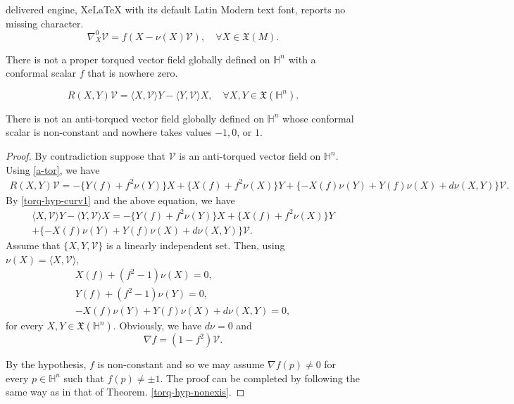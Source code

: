 \documentclass[10pt,a4paper]{amsart}
\def\h{\mathbb H}
\begin{document}
delivered engine, XeLaTeX with its default Latin Modern text font, reports no missing character.
\begin{equation}\label{a-tor}
\nabla^0_X \mathcal{V}=f (X - \nu (X)\mathcal{V}), \quad \forall X\in \mathfrak{X}(M).
\end{equation}

\begin{theorem} \label{torq-hyp-nonexis}
There is not a proper torqued vector field globally defined on $\h^n$ with a conformal scalar $f$ that is nowhere zero.
\end{theorem}

\begin{equation} \label{torq-hyp-curv1}
R(X,Y)\mathcal{V}=\langle X,\mathcal{V}\rangle Y-\langle Y,%
\mathcal{V}\rangle X, \quad \forall X,Y\in \mathfrak{X}(\h^n)  .
\end{equation}%

\begin{theorem}  \label{anti-hyp-nonexis}
There is not an anti-torqued vector field globally defined on $\h^n$ whose conformal scalar is non-constant and nowhere takes values $-1,0$, or $1$.
\end{theorem}

\begin{proof}
By contradiction suppose that $\mathcal{V}$ is an anti-torqued vector field on $\h^n$. Using \eqref{a-tor}, we have
\begin{eqnarray*} \label{anti-hyp}
R(X,Y)\mathcal{V}=-\{ Y(f)+f^{2}\nu (Y)\} X+\{ X(f)+f^{2}\nu(X)\} Y  +\{ -X(f)\nu (Y)+Y(f)\nu (X)+d\nu (X,Y)\} \mathcal{V}. 
\end{eqnarray*}%
By \eqref{torq-hyp-curv1} and the above equation, we have%
\begin{eqnarray*}  \label{anti-hyp2}
\langle X,\mathcal{V}\rangle Y-\langle Y,\mathcal{V}\rangle X =-\{ Y(f)+f^2\nu (Y)\} X+\{
X(f)+f^2\nu (X)\} Y   \\
+\{ -X(f)\nu (Y)+Y(f)\nu (X)+d\nu (X,Y)\} \mathcal{V}. 
\nonumber
\end{eqnarray*}%
Assume that $\{ X,Y,\mathcal{V}\} $ is a linearly independent set. Then, using $\nu (X)=\langle X,\mathcal{V}\rangle ,$  
\begin{eqnarray*}
X(f)+\left( f^{2}-1\right) \nu (X) =0, \\
Y(f)+\left( f^{2}-1\right) \nu (Y) =0, \\
-X(f)\nu (Y)+Y(f)\nu (X)+d\nu (X,Y) =0,
\end{eqnarray*}%
for every $X,Y\in \mathfrak{X}(\h^n).$ Obviously, we
have $d\nu =0$ and
\begin{equation*}
\nabla f=(1-f^{2})\mathcal{V}. \end{equation*}

By the hypothesis, $f$ is non-constant and so we may assume $\nabla f(p)\neq 0$ for every $p \in \h^n$ such that $f(p) \neq \pm 1$. The proof can be completed by following the same way as in that of Theorem. \ref{torq-hyp-nonexis}.
\end{proof}
\end{document}
